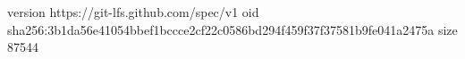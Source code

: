 version https://git-lfs.github.com/spec/v1
oid sha256:3b1da56e41054bbef1bccce2cf22c0586bd294f459f37f37581b9fe041a2475a
size 87544

